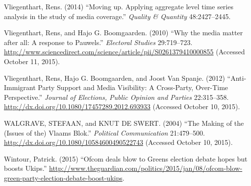 \documentclass[12pt,article]{article}
\begin{document}
Vliegenthart, Rens. (2014) ``Moving up. Applying aggregate level time
series analysis in the study of media coverage.'' \emph{Quality \&
Quantity} 48:2427--2445.

Vliegenthart, Rens, and Hajo G. Boomgaarden. (2010) ``Why the media
matter after all: A response to Pauwels.'' \emph{Electoral Studies}
29:719--723.
\url{http://www.sciencedirect.com/science/article/pii/S0261379410000855}
(Accessed October 11, 2015).

Vliegenthart, Rens, Hajo G. Boomgaarden, and Joost Van Spanje. (2012)
``Anti-Immigrant Party Support and Media Visibility: A Cross-Party,
Over-Time Perspective.'' \emph{Journal of Elections, Public Opinion and
Parties} 22:315--358.
\url{http://dx.doi.org/10.1080/17457289.2012.693933} (Accessed October
10, 2015).

WALGRAVE, STEFAAN, and KNUT DE SWERT. (2004) ``The Making of the (Issues
of the) Vlaams Blok.'' \emph{Political Communication} 21:479--500.
\url{http://dx.doi.org/10.1080/10584600490522743} (Accessed October 10,
2015).

Wintour, Patrick. (2015) ``Ofcom deals blow to Greens election debate
hopes but boosts Ukips.''
\url{http://www.theguardian.com/politics/2015/jan/08/ofcom-blow-green-party-election-debate-boost-ukips}.
\end{document}
